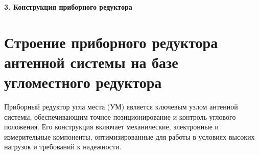 \newpage
\begin{center}
  \textbf{\large 3. Конструкция приборного редуктора }
\end{center}


\section{Строение приборного редуктора антенной системы на базе угломестного редуктора}

Приборный редуктор угла места (УМ) является ключевым узлом антенной системы, обеспечивающим точное позиционирование и контроль углового положения. 
Его конструкция включает механические, электронные и измерительные компоненты, оптимизированные для работы в условиях высоких нагрузок и требований к надежности.


